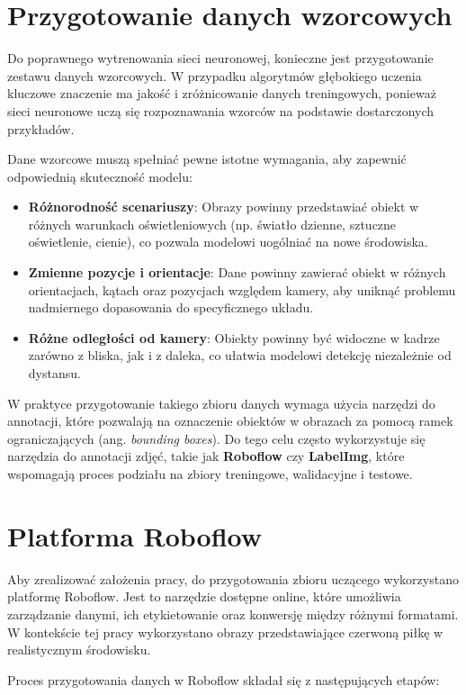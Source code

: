 \documentclass[a4paper,twoside,12pt]{book}
\begin{document}
\section{Przygotowanie danych wzorcowych}
Do poprawnego wytrenowania sieci neuronowej, konieczne jest przygotowanie zestawu danych wzorcowych. W przypadku algorytmów głębokiego uczenia kluczowe znaczenie ma jakość i zróżnicowanie danych treningowych, ponieważ sieci neuronowe uczą się rozpoznawania wzorców na podstawie dostarczonych przykładów. 

Dane wzorcowe muszą spełniać pewne istotne wymagania, aby zapewnić odpowiednią skuteczność modelu:
\begin{itemize}
    \item \textbf{Różnorodność scenariuszy}: Obrazy powinny przedstawiać obiekt w różnych warunkach oświetleniowych (np. światło dzienne, sztuczne oświetlenie, cienie), co pozwala modelowi uogólniać na nowe środowiska.
    \item \textbf{Zmienne pozycje i orientacje}: Dane powinny zawierać obiekt w różnych orientacjach, kątach oraz pozycjach względem kamery, aby uniknąć problemu nadmiernego dopasowania do specyficznego układu.
    \item \textbf{Różne odległości od kamery}: Obiekty powinny być widoczne w kadrze zarówno z bliska, jak i z daleka, co ułatwia modelowi detekcję niezależnie od dystansu.
\end{itemize}

W praktyce przygotowanie takiego zbioru danych wymaga użycia narzędzi do annotacji, które pozwalają na oznaczenie obiektów w obrazach za pomocą ramek ograniczających (ang. \textit{bounding boxes}). Do tego celu często wykorzystuje się narzędzia do annotacji zdjęć, takie jak \textbf{Roboflow} czy \textbf{LabelImg}, które wspomagają proces podziału na zbiory treningowe, walidacyjne i testowe.


\section{Platforma Roboflow}
Aby zrealizować założenia pracy, do przygotowania zbioru uczącego wykorzystano platformę Roboflow. Jest to narzędzie dostępne online, które umożliwia zarządzanie danymi, ich etykietowanie oraz konwersję między różnymi formatami. W kontekście tej pracy wykorzystano obrazy przedstawiające czerwoną piłkę w realistycznym środowisku.

Proces przygotowania danych w Roboflow składał się z następujących etapów:
\end{document}
